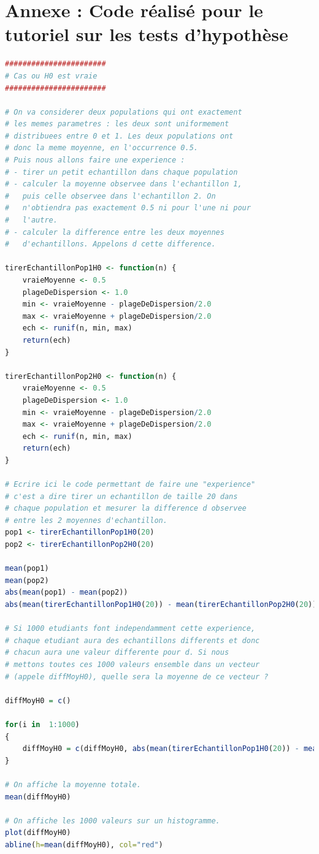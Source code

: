 
\section{Annexe : Code réalisé pour le tutoriel sur les tests d'hypothèse}

\begin{lstlisting}[language=R]
#######################
# Cas ou H0 est vraie 
####################### 

# On va considerer deux populations qui ont exactement
# les memes parametres : les deux sont uniformement 
# distribuees entre 0 et 1. Les deux populations ont
# donc la meme moyenne, en l'occurrence 0.5. 
# Puis nous allons faire une experience : 
# - tirer un petit echantillon dans chaque population
# - calculer la moyenne observee dans l'echantillon 1,
#   puis celle observee dans l'echantillon 2. On 
#   n'obtiendra pas exactement 0.5 ni pour l'une ni pour 
#   l'autre.
# - calculer la difference entre les deux moyennes 
#   d'echantillons. Appelons d cette difference.

tirerEchantillonPop1H0 <- function(n) {
	vraieMoyenne <- 0.5
	plageDeDispersion <- 1.0
	min <- vraieMoyenne - plageDeDispersion/2.0
	max <- vraieMoyenne + plageDeDispersion/2.0
	ech <- runif(n, min, max)
	return(ech)
}

tirerEchantillonPop2H0 <- function(n) {
	vraieMoyenne <- 0.5
	plageDeDispersion <- 1.0
	min <- vraieMoyenne - plageDeDispersion/2.0
	max <- vraieMoyenne + plageDeDispersion/2.0
	ech <- runif(n, min, max)
	return(ech)
}

# Ecrire ici le code permettant de faire une "experience"
# c'est a dire tirer un echantillon de taille 20 dans 
# chaque population et mesurer la difference d observee
# entre les 2 moyennes d'echantillon.
pop1 <- tirerEchantillonPop1H0(20)
pop2 <- tirerEchantillonPop2H0(20)

mean(pop1)
mean(pop2)
abs(mean(pop1) - mean(pop2))
abs(mean(tirerEchantillonPop1H0(20)) - mean(tirerEchantillonPop2H0(20)))

# Si 1000 etudiants font independamment cette experience,
# chaque etudiant aura des echantillons differents et donc
# chacun aura une valeur differente pour d. Si nous 
# mettons toutes ces 1000 valeurs ensemble dans un vecteur
# (appele diffMoyH0), quelle sera la moyenne de ce vecteur ?

diffMoyH0 = c()

for(i in  1:1000)
{
	diffMoyH0 = c(diffMoyH0, abs(mean(tirerEchantillonPop1H0(20)) - mean(tirerEchantillonPop2H0(20))))
}

# On affiche la moyenne totale.
mean(diffMoyH0)

# On affiche les 1000 valeurs sur un histogramme.
plot(diffMoyH0)
abline(h=mean(diffMoyH0), col="red")

\end{lstlisting}

